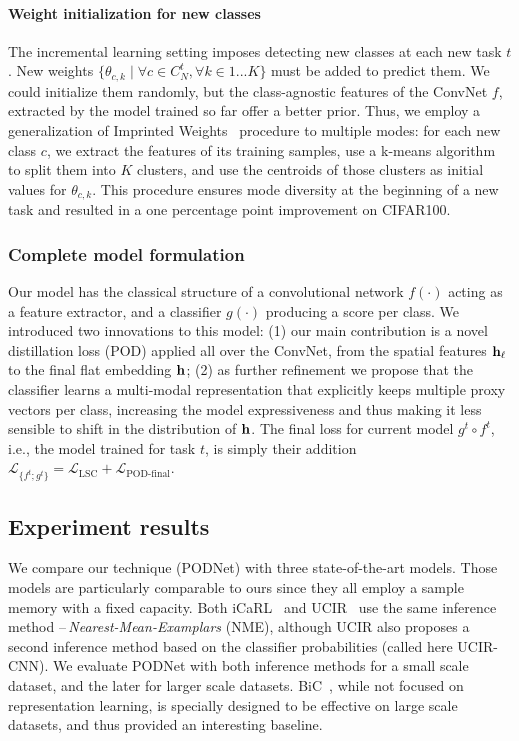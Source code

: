\paragraph{Weight initialization for new classes} The incremental learning setting imposes detecting
new classes at each new task $t$. New weights $\{\theta_{c,k} \mid \forall c \in C^t_N, \forall k
    \in {1...K}\}$ must be added to predict them. We could initialize them randomly, but the
class-agnostic features of the ConvNet $f$, extracted by the model trained so far offer a better
prior. Thus, we employ a generalization of Imprinted Weights~\citep{qi2018imprintedweights}
procedure to multiple modes: for each new class $c$, we extract the features of its training
samples, use a k-means algorithm to split them into $K$ clusters, and use the centroids of those
clusters as initial values for $\theta_{c,k}$. This procedure ensures mode diversity at the
beginning of a new task and resulted in a one percentage point improvement on CIFAR100.


\subsubsection{Complete model formulation}

Our model has the classical structure of a convolutional network $f(\cdot)$ acting as a feature
extractor, and a classifier $g(\cdot)$ producing a score per class. We introduced two innovations to
this model: (1) our main contribution is a novel distillation loss (POD) applied all over the
ConvNet, from the spatial features $\mathbf{h}_\ell$ to the final flat embedding $\mathbf{h}$; (2) as further
refinement we propose that the classifier learns a multi-modal representation that explicitly keeps
multiple proxy vectors per class, increasing the model expressiveness and thus making it less
sensible to shift in the distribution of $\mathbf{h}$. The final loss for current model $g^t \circ f^t$,
i.e., the model trained for task $t$, is simply their addition $\mathcal{L}_{\{f^t; g^t\}} =
    \mathcal{L}_\textrm{LSC} + \mathcal{L}_\textrm{POD-final}$.

\subsection{Experiment results}


We compare our technique (PODNet) with three state-of-the-art models. Those models are particularly
comparable to ours since they all employ a sample memory with a fixed capacity. Both
iCaRL~\citep{rebuffi2017icarl} and UCIR~\citep{hou2019ucir} use the same inference method
--\,\textit{Nearest-Mean-Examplars} (NME), although UCIR also proposes a second inference method
based on the classifier probabilities (called here UCIR-CNN). We evaluate PODNet with both inference
methods for a small scale dataset, and the later for larger scale datasets.
BiC~\citep{wu2019bias_correction}, while not focused on representation learning, is specially
designed to be effective on large scale datasets, and thus provided an interesting baseline.

